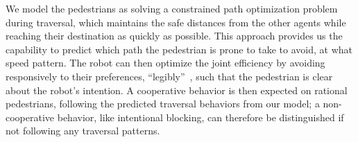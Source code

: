 \documentclass[conference]{IEEEtran}
\begin{document}

We model the pedestrians as solving a constrained path optimization 
problem during traversal, which maintains the safe distances from the other agents while reaching 
their destination as quickly as possible. This approach provides us the 
capability to predict which path the 
pedestrian is prone to take to avoid, at what speed pattern. The robot can 
then optimize the joint efficiency by avoiding responsively to their 
preferences, ``legibly''~\cite{dragan2013legibility}, such that the pedestrian 
is clear about the robot's intention. A cooperative behavior is 
then expected on rational pedestrians, following the predicted traversal 
behaviors from our model; a non-cooperative behavior, like intentional blocking, can 
therefore be distinguished if not following any traversal patterns.


\end{document}
